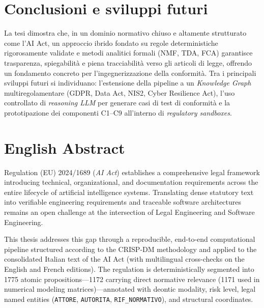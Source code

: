 \documentclass[12pt,a4paper,oneside]{article}
\begin{document}
\section{Conclusioni e sviluppi futuri}

La tesi dimostra che, in un dominio normativo chiuso e altamente strutturato come l'AI Act, un approccio ibrido fondato su regole deterministiche rigorosamente validate e metodi analitici formali (NMF, TDA, FCA) garantisce trasparenza, spiegabilità e piena tracciabilità verso gli articoli di legge, offrendo un fondamento concreto per l'ingegnerizzazione della conformità. Tra i principali sviluppi futuri si individuano: l'estensione della pipeline a un \emph{Knowledge Graph} multiregolamentare (GDPR, Data Act, NIS2, Cyber Resilience Act), l'uso controllato di \emph{reasoning LLM} per generare casi di test di conformità e la prototipazione dei componenti C1--C9 all'interno di \emph{regulatory sandboxes}.

\clearpage


\section*{English Abstract}

Regulation (EU) 2024/1689 (\emph{AI Act}) establishes a comprehensive legal framework introducing technical, organizational, and documentation requirements across the entire lifecycle of artificial intelligence systems. Translating dense statutory text into verifiable engineering requirements and traceable software architectures remains an open challenge at the intersection of Legal Engineering and Software Engineering.

This thesis addresses this gap through a reproducible, end-to-end computational pipeline structured according to the CRISP-DM methodology and applied to the consolidated Italian text of the AI Act (with multilingual cross-checks on the English and French editions). The regulation is deterministically segmented into \num{1775} atomic propositions---\num{1172} carrying direct normative relevance (\num{1171} used in numerical modeling matrices)---annotated with deontic modality, risk level, legal named entities (\texttt{ATTORE}, \texttt{AUTORITA}, \texttt{RIF\_NORMATIVO}), and structural coordinates.
\end{document}

